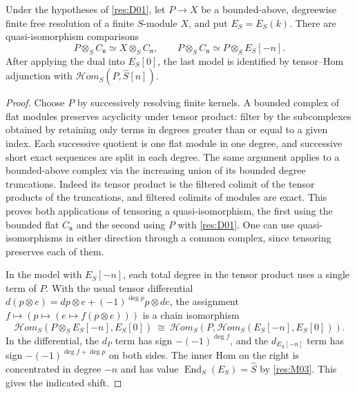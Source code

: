 \begin{lemma}\label{res:D02}
Under the hypotheses of \ref{res:D01}, let
$P\to X$ be a bounded-above, degreewise finite free resolution of
a finite $S$-module $X$, and put $E_S=E_S(k)$. There are
quasi-isomorphism comparisons
\[
 P\otimes_S C_{\mathfrak n}\simeq X\otimes_S C_{\mathfrak n},
 \qquad
 P\otimes_S C_{\mathfrak n}\simeq P\otimes_S E_S[-n].
\]
After applying the dual into $E_S[0]$, the last model is identified
by tensor--Hom adjunction with $\mathcal H om_S(P,\widehat S[n])$.
\end{lemma}
\begin{proof}
Choose $P$ by successively resolving finite kernels. A bounded
complex of flat modules preserves acyclicity under tensor product:
filter by the subcomplexes obtained by retaining only terms
in degrees greater than or equal to a given index. Each successive
quotient is one flat module in one degree, and successive short
exact sequences are split in each degree. The same argument applies
to a bounded-above complex via the increasing union of its bounded
degree truncations. Indeed its tensor product is the filtered
colimit of the tensor products of the truncations, and filtered
colimits of modules are exact. This proves both applications of
tensoring a quasi-isomorphism, the first using the bounded flat
$C_{\mathfrak n}$ and the second using $P$ with \ref{res:D01}.
One can use quasi-isomorphisms in either direction through a
common complex, since tensoring preserves each of them.

In the model with $E_S[-n]$, each total degree in the tensor
product uses a single term of $P$. With the usual tensor
differential $d(p\otimes e)=dp\otimes e+(-1)^{\deg p}p\otimes de$,
the assignment $f\mapsto (p\mapsto(e\mapsto f(p\otimes e)))$
is a chain isomorphism
\[
 \mathcal H om_S(P\otimes_S E_S[-n],E_S[0])
 \ \cong\
 \mathcal H om_S(P,\mathcal H om_S(E_S[-n],E_S[0])) .
\]
In the differential, the $d_P$ term has sign $-(-1)^{\deg f}$,
and the $d_{E_S[-n]}$ term has sign
$-(-1)^{\deg f+\deg p}$ on both sides. The inner Hom on the right
is concentrated in degree $-n$ and has value
$\operatorname{End}_S(E_S)=\widehat S$ by \ref{res:M03}. This
gives the indicated shift.
\end{proof}

